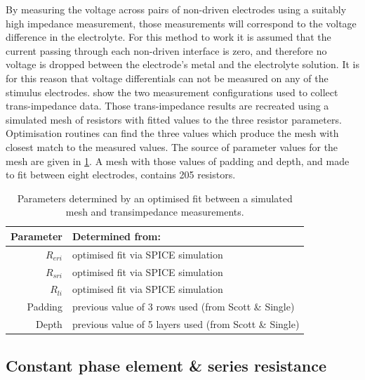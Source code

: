     By measuring the voltage across pairs of non-driven electrodes using a suitably high impedance measurement, those measurements will correspond to the voltage difference in the electrolyte.
    For this method to work it is assumed that the current passing through each non-driven interface is zero, and therefore no voltage is dropped between the electrode's metal and the electrolyte solution.
    It is for this reason that voltage differentials can not be measured on any of the stimulus electrodes.
     show the two measurement configurations used to collect trans-impedance data.
    Those trans-impedance results are recreated using a simulated mesh of resistors with fitted values to the three resistor parameters.
    Optimisation routines can find the three values which produce the mesh with closest match to the measured values.
    The source of parameter values for the mesh are given in \cref{tab:pt2-parameterDesc-ResistorMesh}.
    A mesh with those values of padding and depth, and made to fit between eight electrodes, contains 205 resistors.


    \begin{table}
      \begin{center}
        \begin{tabular} {r | l}
          Parameter & Determined from:\\
          \hline
          $R_{eri}$ & optimised fit via SPICE simulation\\
          $R_{sri}$ & optimised fit via SPICE simulation\\
          $R_{li}$ & optimised fit via SPICE simulation\\
          Padding & previous value of 3 rows used (from Scott \& Single)\\
          Depth & previous value of 5 layers used (from Scott \& Single)
        \end{tabular}
      \end{center}
      \caption{\label{tab:pt2-parameterDesc-ResistorMesh}Parameters determined by an optimised fit between a simulated mesh and transimpedance measurements.}
    \end{table}



  \subsection{Constant phase element \& series resistance}


